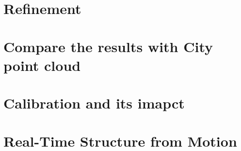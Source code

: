 \documentclass[11pt]{article}
\begin{document}
    \section{Refinement}


    \section{Compare the results with City point cloud}
    
    \section{Calibration and its imapct}

    \section{Real-Time Structure from Motion}
\end{document}
